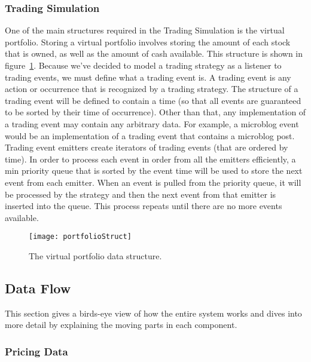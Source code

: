 \subsubsection{Trading Simulation}

One of the main structures required in the Trading Simulation is the virtual portfolio. Storing a virtual portfolio involves storing the amount of each stock that is owned, as well as the amount of cash available. This structure is shown in figure~\ref{portfolioStruct}. Because we've decided to model a trading strategy as a listener to trading events, we must define what a trading event is. A trading event is any action or occurrence that is recognized by a trading strategy. The structure of a trading event will be defined to contain a time (so that all events are guaranteed to be sorted by their time of occurrence). Other than that, any implementation of a trading event may contain any arbitrary data. For example, a microblog event would be an implementation of a trading event that contains a microblog post. Trading event emitters create iterators of trading events (that are ordered by time). In order to process each event in order from all the emitters efficiently, a min priority queue that is sorted by the event time will be used to store the next event from each emitter. When an event is pulled from the priority queue, it will be processed by the strategy and then the next event from that emitter is inserted into the queue. This process repeats until there are no more events available.

\begin{figure}[h]
  \label{portfolioStruct}
  \begin{center}
    \texttt{[image: portfolioStruct]}
  \end{center}
  \caption{The virtual portfolio data structure.}
\end{figure}

\subsection{Data Flow}

This section gives a birds-eye view of how the entire system works and dives into more detail by explaining the moving parts in each component.


\subsubsection{Pricing Data}

